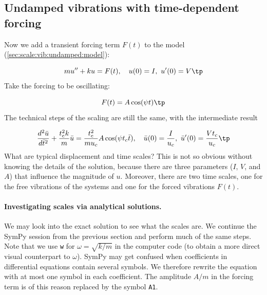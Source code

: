 \documentclass[graybox,envcountchap,sectrefs,final]{svmonodo}
\begin{document}
\subsection{Undamped vibrations with time-dependent forcing}
\label{sec:scale:vib:undamped:F}

Now we add a transient forcing term $F(t)$ to the model
(\ref{sec:scale:vib:undamped:model}):

\begin{equation}
mu'' + ku = F(t),\quad u(0)=I,\ u'(0)=V\tp
\label{sec:scale:vib:undamped:F:model}
\end{equation}
Take the forcing to be oscillating:

\[ F(t) = A\cos(\psi t)\tp\]
The technical steps of the scaling are still the same, with the
intermediate result

\begin{equation}
\frac{d^2\bar u}{d\bar t^2} + \frac{t_c^2 k}{m}\bar u =
\frac{t_c^2}{mu_c}A\cos(\psi t_c\bar t),
\quad \bar u(0)=\frac{I}{u_c},\ \bar u'(0)=\frac{Vt_c}{u_c}\tp
\label{sec:scale:vib:undamped:F:model:scaled0}
\end{equation}
What are typical displacement and time scales? This is not so obvious
without knowing the details of the solution, because there are
three parameters ($I$, $V$, and $A$) that influence the magnitude of $u$.
Moreover, there are two time scales, one for the free vibrations of
the systems and one for the forced vibrations $F(t)$.

\paragraph{Investigating scales via analytical solutions.}
We may look into the exact solution to see what the scales are.  We
continue the SymPy session from the previous section and perform much
of the same steps. Note that we use \texttt{w} for $\omega = \sqrt{k/m}$
in the computer code (to obtain a more direct visual counterpart to
$\omega$).
SymPy may get confused when coefficients in differential equations
contain several symbols. We therefore rewrite the equation with
at most one symbol in each coefficient.
The amplitude $A/m$ in the forcing term is of this reason
replaced by the symbol \texttt{A1}.
\end{document}
